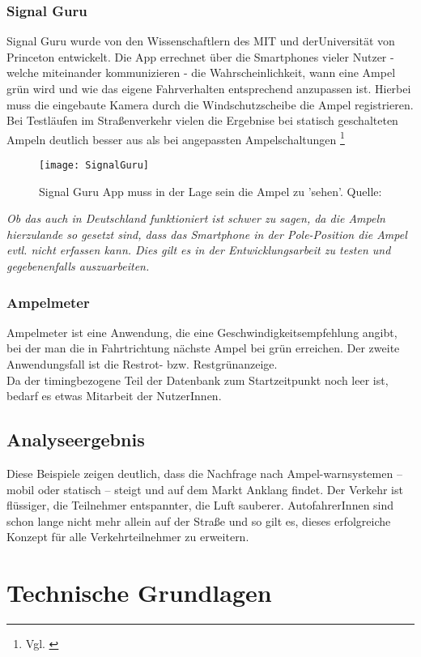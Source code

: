 \subsubsection{Signal Guru}
Signal Guru wurde von den Wissenschaftlern des \gls{MIT} und derUniversität von Princeton entwickelt. Die App errechnet über die Smartphones vieler Nutzer - welche miteinander kommunizieren -  die Wahrscheinlichkeit, wann eine Ampel grün wird und wie das eigene Fahrverhalten entsprechend anzupassen ist. Hierbei muss die eingebaute Kamera durch die Windschutzscheibe die Ampel registrieren. Bei Testläufen im Straßenverkehr vielen die Ergebnise bei statisch geschalteten Ampeln deutlich besser aus als bei angepassten Ampelschaltungen \footnote{Vgl. \cite{SignalGuru}} 
\begin{figure}[H]
    \centering
    \texttt{[image: SignalGuru]}
    \caption[Signal Guru]{Signal Guru App muss in der Lage sein die Ampel zu 'sehen'.  Quelle: \cite{SignalGuruPaper}}
    \label{fig:AppSignalGuru}
\end{figure}
\textit{Ob das auch in Deutschland funktioniert ist schwer zu sagen, da die Ampeln hierzulande so gesetzt sind, dass das Smartphone in der Pole-Position die Ampel evtl. nicht erfassen kann. Dies gilt es in der Entwicklungsarbeit zu testen und gegebenenfalls auszuarbeiten.}
\subsubsection{Ampelmeter}
Ampelmeter ist eine Anwendung, die eine Geschwindigkeitsempfehlung angibt, bei der man die in Fahrtrichtung nächste Ampel bei grün erreichen. Der zweite Anwendungsfall ist die Restrot- bzw. Restgrünanzeige.\\
Da der timingbezogene Teil der Datenbank zum Startzeitpunkt noch leer ist, bedarf es etwas Mitarbeit der NutzerInnen.
\subsection{Analyseergebnis}
Diese Beispiele zeigen deutlich, dass die Nachfrage nach Ampel-warnsystemen -- mobil oder statisch -- steigt und auf dem Markt Anklang findet. Der Verkehr ist flüssiger, die Teilnehmer entspannter, die Luft sauberer. AutofahrerInnen sind schon lange nicht mehr allein auf der Straße und so gilt es, dieses erfolgreiche Konzept für alle Verkehrteilnehmer zu erweitern.
\section{Technische Grundlagen}
